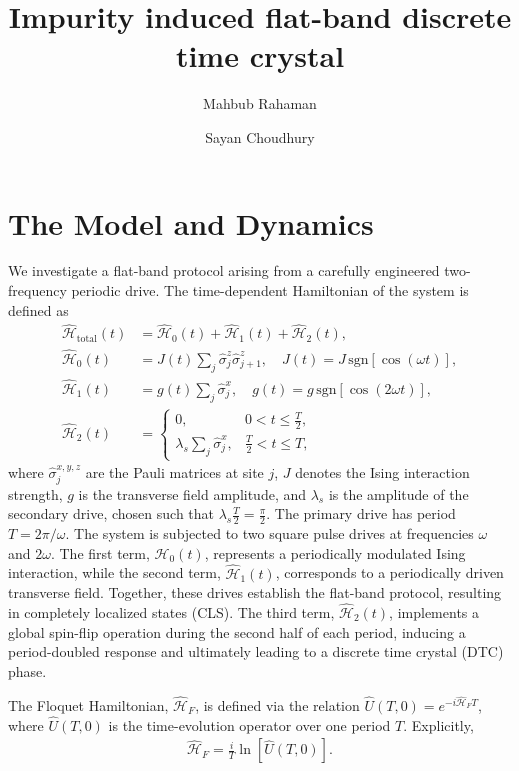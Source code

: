 \documentclass[a4paper,10pt]{article}
\title{Impurity induced flat-band discrete time crystal}
\author[1]{Mahbub Rahaman}
\author[1]{Sayan Choudhury}
\affil[1]{\small Harish-Chandra Research Institute, HBNI, Chhatnag Road, Jhunsi, Praygraj, UP - 211019, India}
\date{}
\begin{document}
\maketitle

\section{The Model and Dynamics}
We investigate a flat-band protocol arising from a carefully engineered two-frequency periodic drive. The time-dependent Hamiltonian of the system is defined as
\begin{align}
    \hat{\mathcal{H}}_{\text{total}}(t) &=  \hat{\mathcal{H}}_0(t) + \hat{\mathcal{H}}_1(t)  + \hat{\mathcal{H}}_2(t), \\
    \hat{\mathcal{H}}_0(t) &= J(t)\sum_{j} \hat{\sigma}_j^z \hat{\sigma}_{j+1}^z, \quad J(t) = J\, \mathrm{sgn}[\cos(\omega t)], \\
    \hat{\mathcal{H}}_1(t) &= g(t)\sum_{j}\hat{\sigma}_j^x, \quad g(t) = g\, \mathrm{sgn}[\cos(2 \omega t)], \\
    \hat{\mathcal{H}}_2(t) &=
    \begin{cases}
        0, & 0 < t \leq \frac{T}{2}, \\
        \lambda_s \sum_{j}\hat{\sigma}_j^x, & \frac{T}{2} < t \leq T,
    \end{cases}
\end{align}
where $\hat{\sigma}_j^{x,y,z}$ are the Pauli matrices at site $j$, $J$ denotes the Ising interaction strength, $g$ is the transverse field amplitude, and $\lambda_s$ is the amplitude of the secondary drive, chosen such that $\lambda_s \frac{T}{2} = \frac{\pi}{2}$. The primary drive has period $T = 2\pi/\omega$. The system is subjected to two square pulse drives at frequencies $\omega$ and $2\omega$. The first term, $\hat{\mathcal{H}}_0(t)$, represents a periodically modulated Ising interaction, while the second term, $\hat{\mathcal{H}}_1(t)$, corresponds to a periodically driven transverse field. Together, these drives establish the flat-band protocol, resulting in completely localized states (CLS). The third term, $\hat{\mathcal{H}}_2(t)$, implements a global spin-flip operation during the second half of each period, inducing a period-doubled response and ultimately leading to a discrete time crystal (DTC) phase.

The Floquet Hamiltonian, $\hat{\mathcal{H}}_F$, is defined via the relation $\hat{U}(T,0) = e^{-i \hat{\mathcal{H}}_F T}$, where $\hat{U}(T,0)$ is the time-evolution operator over one period $T$. Explicitly,
\begin{align}
    \hat{\mathcal{H}}_F = \frac{i}{T} \ln[\hat{U}(T,0)].
\end{align}
\end{document}

